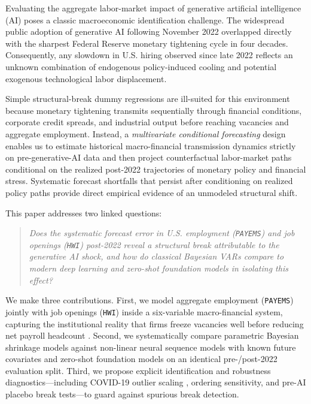 \documentclass[11pt,a4paper]{article}
\begin{document}
Evaluating the aggregate labor-market impact of generative artificial intelligence (AI) poses a classic macroeconomic identification challenge. The widespread public adoption of generative AI following November 2022 overlapped directly with the sharpest Federal Reserve monetary tightening cycle in four decades. Consequently, any slowdown in U.S. hiring observed since late 2022 reflects an unknown combination of endogenous policy-induced cooling and potential exogenous technological labor displacement.

Simple structural-break dummy regressions are ill-suited for this environment because monetary tightening transmits sequentially through financial conditions, corporate credit spreads, and industrial output before reaching vacancies and aggregate employment. Instead, a \emph{multivariate conditional forecasting} design \citep{waggoner1999conditional,banbura2015conditional,crump2021large} enables us to estimate historical macro-financial transmission dynamics strictly on pre-generative-AI data and then project counterfactual labor-market paths conditional on the realized post-2022 trajectories of monetary policy and financial stress. Systematic forecast shortfalls that persist after conditioning on realized policy paths provide direct empirical evidence of an unmodeled structural shift.

This paper addresses two linked questions:
\begin{quote}
\emph{Does the systematic forecast error in U.S. employment (\texttt{PAYEMS}) and job openings (\texttt{HWI}) post-2022 reveal a structural break attributable to the generative AI shock, and how do classical Bayesian VARs compare to modern deep learning and zero-shot foundation models in isolating this effect?}
\end{quote}

We make three contributions. First, we model aggregate employment (\texttt{PAYEMS}) jointly with job openings (\texttt{HWI}) inside a six-variable macro-financial system, capturing the institutional reality that firms freeze vacancies well before reducing net payroll headcount \citep{pater2017beveridge}. Second, we systematically compare parametric Bayesian shrinkage models against non-linear neural sequence models with known future covariates \citep{lim2021temporal} and zero-shot foundation models \citep{ansari2024chronos,das2024decoder} on an identical pre-/post-2022 evaluation split. Third, we propose explicit identification and robustness diagnostics---including COVID-19 outlier scaling \citep{lenza2022estimate}, ordering sensitivity, and pre-AI placebo break tests---to guard against spurious break detection.
\end{document}
